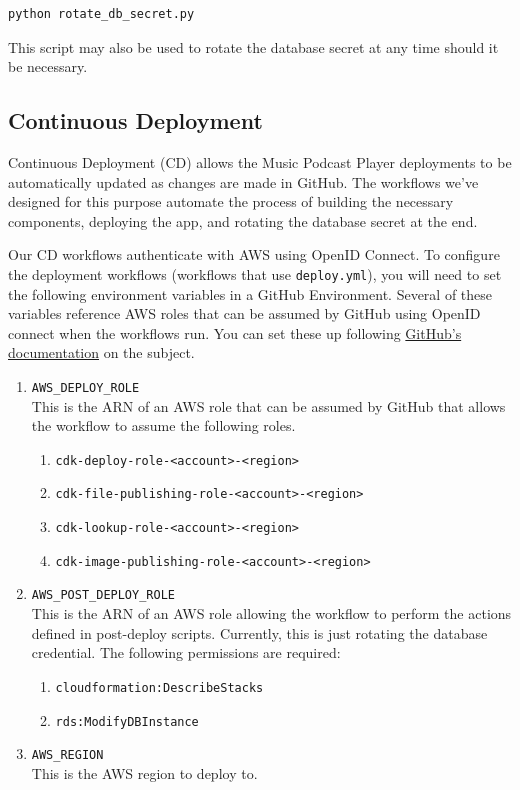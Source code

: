 \documentclass{article}
\begin{document}
\begin{verbatim}
python rotate_db_secret.py
\end{verbatim}

This script may also be used to rotate the database secret at any time should it be 
necessary.

\subsection{Continuous Deployment}

Continuous Deployment (CD) allows the Music Podcast Player deployments to be
automatically updated as changes are made in GitHub. The workflows we've designed for
this purpose automate the process of building the necessary components, deploying the
app, and rotating the database secret at the end.

Our CD workflows authenticate with AWS using OpenID Connect.
To configure the deployment workflows (workflows that use \verb|deploy.yml|), you will 
need to set the following environment variables in a GitHub Environment. Several of these
variables reference AWS roles that can be assumed by GitHub using OpenID connect when the
workflows run. You can set these up following \href{https://docs.github.com/en/actions/how-tos/secure-your-work/security-harden-deployments/oidc-in-aws}
{GitHub's documentation} on the subject.

\begin{enumerate}
    \item \verb|AWS_DEPLOY_ROLE| \\
    This is the ARN of an AWS role that can be assumed by GitHub that allows the workflow
    to assume the following roles.
    \begin{enumerate}
        \item \verb|cdk-deploy-role-<account>-<region>|
        \item \verb|cdk-file-publishing-role-<account>-<region>|
        \item \verb|cdk-lookup-role-<account>-<region>|
        \item \verb|cdk-image-publishing-role-<account>-<region>|
    \end{enumerate}
    \item \verb|AWS_POST_DEPLOY_ROLE| \\
    This is the ARN of an AWS role allowing the workflow to perform the actions defined
    in post-deploy scripts. Currently, this is just rotating the database credential. The
    following permissions are required:
    \begin{enumerate}
        \item \verb|cloudformation:DescribeStacks|
        \item \verb|rds:ModifyDBInstance|
    \end{enumerate}
    \item \verb|AWS_REGION| \\
    This is the AWS region to deploy to.
\end{enumerate}
\end{document}
